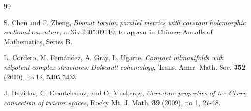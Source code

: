 \documentclass{amsart}
\begin{document}
\begin{thebibliography}{99}


 S. Chen and F. Zheng, \emph {Bismut torsion parallel metrics with constant holomorphic sectional curvature,} arXiv:2405.09110, to appear in Chinese Annalls of Mathematics, Series B.



 L. Cordero, M. Fern\'{a}ndez, A. Gray, L. Ugarte, \emph{Compact nilmanifolds with nilpotent complex structures: Dolbeault cohomology}, Trans. Amer. Math. Soc. {\bf 352} (2000), no.12, 5405-5433.


 J. Davidov, G. Grantcharov, and O. Muskarov, \emph{Curvature properties of the Chern connection of twistor spaces,}
Rocky Mt. J. Math. {\bf 39} (2009), no.\,1,  27-48.











\end{thebibliography}
\end{document}
